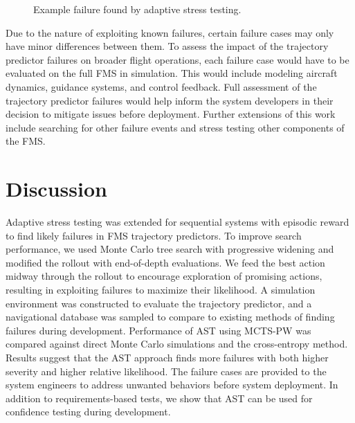 \begin{figure*}[!t]
  \centering
    \hspace{2mm}
  \caption{
    \label{fig:example_failure_full} Example failure found by adaptive stress testing. 
  } 
\end{figure*}


Due to the nature of exploiting known failures, certain failure cases may only have minor differences between them.
To assess the impact of the trajectory predictor failures on broader flight operations, each failure case would have to be evaluated on the full FMS in simulation.
This would include modeling aircraft dynamics, guidance systems, and control feedback. 
Full assessment of the trajectory predictor failures would help inform the system developers in their decision to mitigate issues before deployment.
Further extensions of this work include searching for other failure events and stress testing other components of the FMS.


\section{Discussion}
\label{sec:ast_discussion}
Adaptive stress testing was extended for sequential systems with episodic reward to find likely failures in FMS trajectory predictors.
To improve search performance, we used Monte Carlo tree search with progressive widening and modified the rollout with end-of-depth evaluations.
We feed the best action midway through the rollout to encourage exploration of promising actions, resulting in exploiting failures to maximize their likelihood. 
A simulation environment was constructed to evaluate the trajectory predictor, and a navigational database was sampled to compare to existing methods of finding failures during development.
Performance of AST using MCTS-PW was compared against direct Monte Carlo simulations and the cross-entropy method.
Results suggest that the AST approach finds more failures with both higher severity and higher relative likelihood.
The failure cases are provided to the system engineers to address unwanted behaviors before system deployment.
In addition to requirements-based tests, we show that AST can be used for confidence testing during development.
